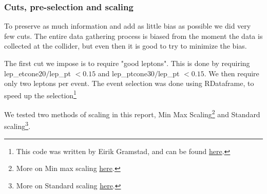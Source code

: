 \documentclass[ reprint, amsmath,amssymb, aps, nofootinbib]{revtex4-2}
\begin{document}
\subsubsection{Cuts, pre-selection and scaling}
To preserve as much information and add as little bias as possible we did very few cuts. The entire data gathering process is biased from the moment the data is collected at the collider, but even then it is good to try to minimize the bias. \par
The first cut we impose is to require "good leptons". This is done by requiring lep\_etcone$20/$lep\_pt $< 0.15$ and lep\_ptcone$30/$lep\_pt $< 0.15$. We then require only two leptons per event. The event selection was done using RDataframe, to speed up the selection\footnote{This code was written by Eirik Gramstad, and can be found \href{https://github.uio.no/zpath/software/blob/eirik-dev/Notebooks/ATLASOpenData/13TeV/RDataFrameToDF.ipynb}{here}.}\par 
We tested two methods of scaling in this report, Min Max Scaling\footnote{More on Min max scaling \href{https://scikit-learn.org/stable/modules/generated/sklearn.preprocessing.MinMaxScaler.html}{here}.} and Standard scaling\footnote{More on Standard scaling \href{https://scikit-learn.org/stable/modules/generated/sklearn.preprocessing.StandardScaler.html}{here}.}\cite{scikit-learn}.
\end{document}
